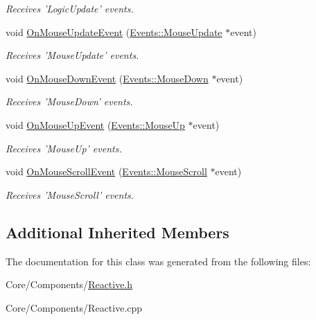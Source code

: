 \begin{DoxyCompactItemize}
\begin{DoxyCompactList}\small\item\em Receives 'Logic\-Update' events. \end{DoxyCompactList}\item 
\hypertarget{classDCEngine_1_1Components_1_1Reactive_aca6b7d01f0c1ec14d9208c949f24eb0f}{void \hyperlink{classDCEngine_1_1Components_1_1Reactive_aca6b7d01f0c1ec14d9208c949f24eb0f}{On\-Mouse\-Update\-Event} (\hyperlink{classDCEngine_1_1Events_1_1MouseUpdate}{Events\-::\-Mouse\-Update} $\ast$event)}\label{classDCEngine_1_1Components_1_1Reactive_aca6b7d01f0c1ec14d9208c949f24eb0f}

\begin{DoxyCompactList}\small\item\em Receives 'Mouse\-Update' events. \end{DoxyCompactList}\item 
\hypertarget{classDCEngine_1_1Components_1_1Reactive_ac69f53f8eb5db3fdd1538f033ebd47ba}{void \hyperlink{classDCEngine_1_1Components_1_1Reactive_ac69f53f8eb5db3fdd1538f033ebd47ba}{On\-Mouse\-Down\-Event} (\hyperlink{classDCEngine_1_1Events_1_1MouseDown}{Events\-::\-Mouse\-Down} $\ast$event)}\label{classDCEngine_1_1Components_1_1Reactive_ac69f53f8eb5db3fdd1538f033ebd47ba}

\begin{DoxyCompactList}\small\item\em Receives 'Mouse\-Down' events. \end{DoxyCompactList}\item 
\hypertarget{classDCEngine_1_1Components_1_1Reactive_a512d248b0885e81471d2c901a1b2d720}{void \hyperlink{classDCEngine_1_1Components_1_1Reactive_a512d248b0885e81471d2c901a1b2d720}{On\-Mouse\-Up\-Event} (\hyperlink{classDCEngine_1_1Events_1_1MouseUp}{Events\-::\-Mouse\-Up} $\ast$event)}\label{classDCEngine_1_1Components_1_1Reactive_a512d248b0885e81471d2c901a1b2d720}

\begin{DoxyCompactList}\small\item\em Receives 'Mouse\-Up' events. \end{DoxyCompactList}\item 
\hypertarget{classDCEngine_1_1Components_1_1Reactive_abe0436cbaf859b2cb17daa78117ed3d1}{void \hyperlink{classDCEngine_1_1Components_1_1Reactive_abe0436cbaf859b2cb17daa78117ed3d1}{On\-Mouse\-Scroll\-Event} (\hyperlink{classDCEngine_1_1Events_1_1MouseScroll}{Events\-::\-Mouse\-Scroll} $\ast$event)}\label{classDCEngine_1_1Components_1_1Reactive_abe0436cbaf859b2cb17daa78117ed3d1}

\begin{DoxyCompactList}\small\item\em Receives 'Mouse\-Scroll' events. \end{DoxyCompactList}\end{DoxyCompactItemize}
\subsection*{Additional Inherited Members}


The documentation for this class was generated from the following files\-:\begin{DoxyCompactItemize}
\item 
Core/\-Components/\hyperlink{Reactive_8h}{Reactive.\-h}\item 
Core/\-Components/Reactive.\-cpp\end{DoxyCompactItemize}
